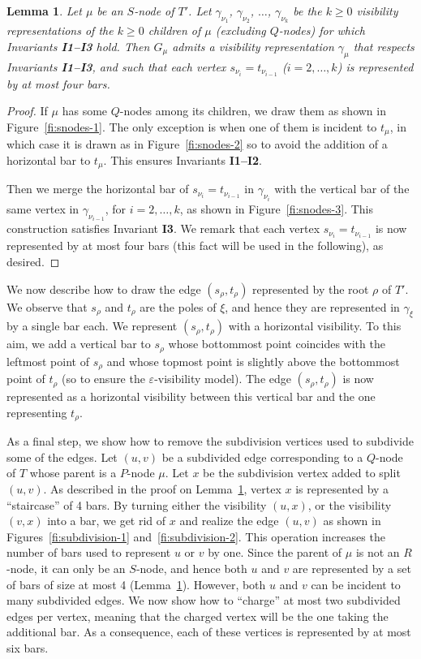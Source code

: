 \documentclass{article}
\newtheorem{lemma}{Lemma}
\begin{document}
\begin{lemma}\label{le:snodes}
Let $\mu$ be an $S$-node of $T'$. Let $\gamma_{\nu_1}$, $\gamma_{\nu_2}$, $\dots$, $\gamma_{\nu_k}$ be the $k \geq 0$ visibility representations of the $k \geq 0$ children of $\mu$ (excluding $Q$-nodes) for which Invariants {\bf I1--I3} hold. Then $G_\mu$ admits a visibility representation $\gamma_\mu$ that respects Invariants {\bf I1--I3}, and such that each vertex $s_{\nu_i}=t_{\nu_{i-1}}$ ($i=2,\dots,k$) is  represented by at most four bars.
\end{lemma}
\begin{proof}
If $\mu$ has some $Q$-nodes among its children, we draw them as shown in Figure~\ref{fi:snodes-1}. The only exception is when one of them is incident to $t_\mu$, in which case it is drawn as in Figure~\ref{fi:snodes-2} so to avoid the addition of a horizontal bar to $t_\mu$. This ensures Invariants {\bf I1--I2}.

Then we merge the horizontal bar of $s_{\nu_i}=t_{\nu_{i-1}}$ in $\gamma_{\nu_i}$ with the vertical bar of the same vertex in $\gamma_{\nu_{i-1}}$, for $i=2,\dots,k$, as shown in Figure~\ref{fi:snodes-3}. This construction satisfies Invariant {\bf I3}. We remark that each vertex $s_{\nu_i}=t_{\nu_{i-1}}$ is now represented by at most four bars  (this fact will be used in the following), as desired.
\end{proof}


We now describe how to draw the edge $(s_\rho,t_\rho)$ represented by the root $\rho$ of $T'$. We observe that $s_\rho$ and $t_\rho$ are the poles of $\xi$, and hence they are represented in $\gamma_\xi$ by a single bar each. We represent $(s_\rho,t_\rho)$ with a horizontal visibility. To this aim, we add a vertical bar to $s_\rho$ whose bottommost point coincides with the leftmost point of $s_\rho$ and whose topmost point is slightly above the bottommost point of $t_\rho$ (so to ensure the $\varepsilon$-visibility model). The edge $(s_\rho,t_\rho)$ is now represented as a horizontal visibility between this vertical bar and the one representing $t_\rho$.

As a final step, we show how to remove the subdivision vertices used to subdivide some of the edges. Let $(u,v)$ be a subdivided edge corresponding to a $Q$-node of $T$ whose parent is a $P$-node $\mu$. Let $x$ be the subdivision vertex added to split $(u,v)$. As described in the proof on Lemma~\ref{le:snodes}, vertex $x$ is represented by a ``staircase'' of 4 bars. By turning either the visibility $(u,x)$, or the visibility $(v,x)$ into a bar, we get rid of $x$ and realize the edge $(u,v)$ as shown in Figures~\ref{fi:subdivision-1} and~\ref{fi:subdivision-2}. This operation increases  the number of bars used to represent $u$ or $v$ by one. Since the parent of $\mu$ is not an $R$-node, it can only be an $S$-node, and hence both $u$ and $v$ are represented by a set of bars of size at most 4 (Lemma~\ref{le:snodes}). However, both $u$ and $v$ can be incident to many subdivided edges. We now show how to ``charge'' at most two subdivided edges per vertex, meaning that the charged vertex will be the one taking the additional bar. As a consequence, each of these vertices is represented by at most six bars.
\end{document}
